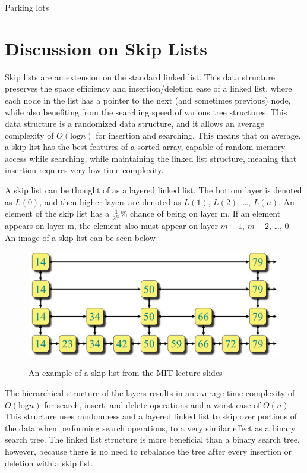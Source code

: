 \documentclass{article}
\begin{document}
    Parking lots

\pagebreak

\section*{Discussion on Skip Lists}

Skip lists are an extension on the standard linked list. This data structure preserves the space efficiency and insertion/deletion ease of a linked list, where each node in the list has a pointer to the next (and sometimes previous) node, while also benefiting from the searching speed of various tree structures. This data structure is a randomized data structure, and it allows an average complexity of $O(\text{log} n)$ for insertion and searching. This means that on average, a skip list has the best features of a sorted array, capable of random memory access while searching, while maintaining the linked list structure, meaning that insertion requires very low time complexity. 

A skip list can be thought of as a layered linked list. The bottom layer is denoted as $L(0)$, and then higher layers are denoted as $L(1)$, $L(2)$, \ldots, $L(n)$. An element of the skip list has a $\frac{1}{2^m}$\% chance of being on layer m. If an element appears on layer m, the element also must appear on layer $m-1$, $m-2$, \ldots, $0$. An image of a skip list can be seen below

\begin{figure}[h]
    \centering
    \includegraphics[width=\textwidth,keepaspectratio]{Images/SkipList_MIT.PNG}
    \label{fig:my_label}
    \caption{An example of a skip list from the MIT lecture slides}
\end{figure}

The hierarchical structure of the layers results in an average time complexity of $O(\text{log} n)$ for search, insert, and delete operations and a worst case of $O(n)$. This structure uses randomness and a layered linked list to skip over portions of the data when performing search operations, to a very similar effect as a binary search tree. The linked list structure is more beneficial than a binary search tree, however, because there is no need to rebalance the tree after every insertion or deletion with a skip list.
\end{document}
